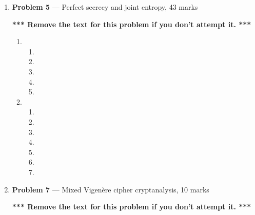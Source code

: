 \documentclass[11pt]{article}
\theoremstyle{definition}
\begin{document}
	
	\begin{enumerate}
	\item[] \textbf{Problem 5} --- Perfect secrecy and joint entropy, 43 marks
	
	\textbf{*** Remove the text for this problem if you don't attempt it. ***}
	
	\begin{enumerate}
	
	\item
	\begin{enumerate}
	
	\item
	
	\item
	
	\item
	
	\item
	
	\item
	\end{enumerate}
	
	\item
	\begin{enumerate}
	\item
	
	\item
	
	\item
	
	\item
	
	\item
	
	\item
	
	\item
	\end{enumerate}
	\end{enumerate}
	
	\item[] \textbf{Problem 7} --- Mixed Vigen\`ere cipher cryptanalysis, 10 marks
	
	\textbf{*** Remove the text for this problem if you don't attempt it. ***}
	
	
	\end{enumerate}
\end{document}
